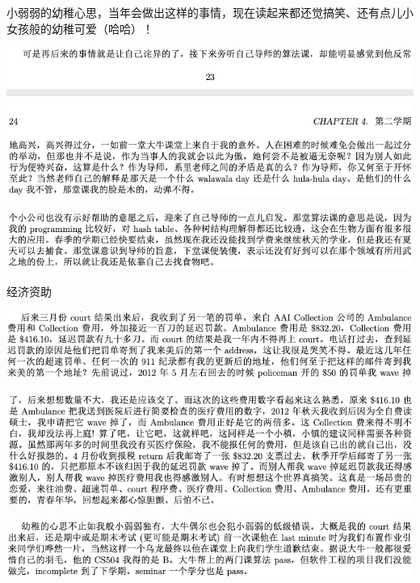 \documentclass[9pt, b5paper]{article}
\begin{document}
小弱弱的幼稚心思，当年会做出这样的事情，现在读起来都还觉搞笑、还有点儿小女孩般的幼稚可爱（哈哈）！

\begin{center}
\includegraphics[width=.9\linewidth]{./pic/backups_plans_20210424_213954.png}
\end{center}

\begin{center}
\includegraphics[width=.9\linewidth]{./pic/backups_plans_20210424_214124.png}
\end{center}

经济资助

\begin{center}
\includegraphics[width=.9\linewidth]{./pic/backups_plans_20210424_215120.png}
\end{center}

\begin{center}
\includegraphics[width=.9\linewidth]{./pic/backups_plans_20210424_215147.png}
\end{center}

\begin{center}
\includegraphics[width=.9\linewidth]{./pic/backups_plans_20210424_215618.png}
\end{center}
\end{document}
